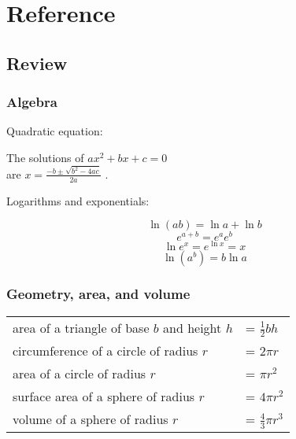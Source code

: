 \twocolumn\chapter{Reference}

\section{Review}

\newcommand{\mathsummaryfont}{\normalsize\normalfont\small}
\newenvironment{ind}
	{%
	}
	{%
	}

\mathsummaryfont

\subsection{Algebra}

\noindent Quadratic equation:

\begin{ind}
  The solutions of $ax^2+bx+c=0$ \\
  are $x=\frac{-b\pm\sqrt{b^2-4ac}}{2a}$ \quad .
\end{ind}

\noindent Logarithms and exponentials:

\begin{ind}
  \begin{equation*}   \ln(ab)=\ln a + \ln b    \end{equation*}
  \begin{equation*}   e^{a+b} = e^ae^b    \end{equation*}
  \begin{equation*}   \ln e^x = e^{\ln x} = x    \end{equation*}
  \begin{equation*}   \ln(a^b) = b \ln a    \end{equation*}
\end{ind}

\subsection{Geometry, area, and volume}

\noindent\begin{tabular}{p{30mm}l}
  area of a triangle of base $b$ and height $h$     & = $\frac{1}{2}bh$ \\
  circumference of a circle of radius $r$           &= $2\pi r$ \\
  area of a circle of radius $r$                    &= $\pi r^2$ \\
  surface area of a sphere of radius $r$            &= $4\pi r^2$ \\
  volume of a sphere of radius $r$                  &= $\frac{4}{3}\pi r^3$
\end{tabular}

